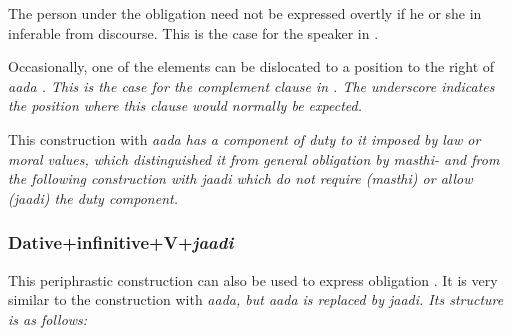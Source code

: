 
The person under the obligation need not be expressed overtly if he or she in inferable from discourse. This is the case for the speaker in .


Occasionally, one of the elements can be dislocated to a position to the right of \em aada \em. This is the case for the complement clause in . The underscore indicates the position where this clause would normally be expected.


This  construction with \em aada \em has a component of duty to it imposed by law or moral values, which distinguished it from general obligation by \em masthi- \em and from the following construction with \em jaadi \em which do not require (\em masthi\em) or allow (\em jaadi\em) the duty component.


\subsubsection[\textsc{dat + inf + V} + \textit{jaadi}]{Dative+infinitive+V+\em jaadi\em}\label{sec:wc:Dative+infinitive+V+jaadi}
This periphrastic construction can also be used to express obligation . It is very similar to the construction with \em aada\em, but \em aada \em is replaced by \em jaadi\em. Its structure is as follows:



